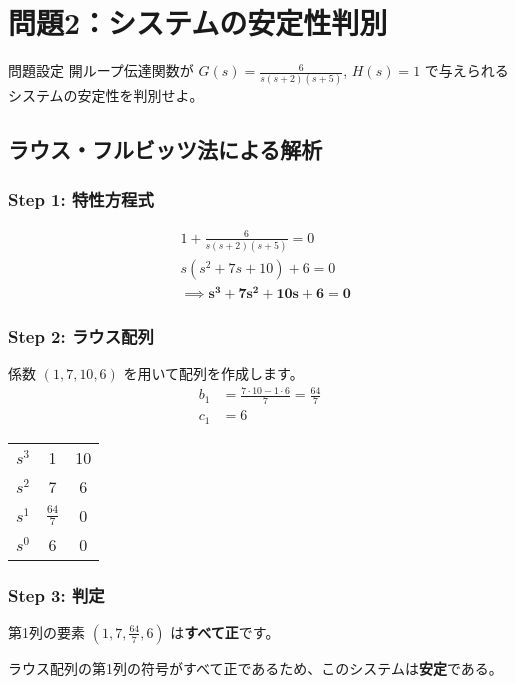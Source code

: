 \documentclass[11pt,a4paper]{ltjsarticle}
\begin{document}
\clearpage
\section{問題2：システムの安定性判別}
\begin{example}{問題設定}
    開ループ伝達関数が $G(s) = \frac{6}{s(s+2)(s+5)}$, $H(s)=1$ で与えられるシステムの安定性を判別せよ。
\end{example}

\subsection{ラウス・フルビッツ法による解析}
\subsubsection{Step 1: 特性方程式}
\begin{align*}
&1 + \frac{6}{s(s+2)(s+5)} = 0 \\
&s(s^2+7s+10) + 6 = 0 \\
&\implies \bm{s^3 + 7s^2 + 10s + 6 = 0}
\end{align*}

\subsubsection{Step 2: ラウス配列}
係数 $(1, 7, 10, 6)$ を用いて配列を作成します。
\begin{align*}
b_1 &= \frac{7 \cdot 10 - 1 \cdot 6}{7} = \frac{64}{7} \\
c_1 &= 6
\end{align*}
\begin{center}
\begin{tabular}{c|cc}
\toprule
$s^3$ & 1 & 10 \\
$s^2$ & 7 & 6 \\
$s^1$ & $\frac{64}{7}$ & 0 \\
$s^0$ & 6 & 0 \\
\bottomrule
\end{tabular}
\end{center}

\subsubsection{Step 3: 判定}
第1列の要素 $(1, 7, \frac{64}{7}, 6)$ は\textbf{すべて正}です。
\begin{tcolorbox}[title=ラウス法による結論, colback=green!10!white, colframe=green!75!black]
    ラウス配列の第1列の符号がすべて正であるため、このシステムは\textbf{安定}である。
\end{tcolorbox}
\end{document}
